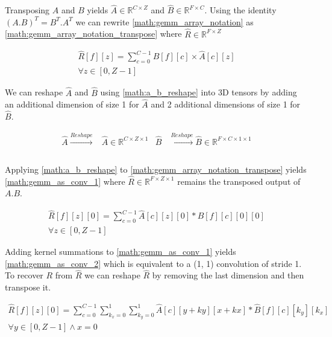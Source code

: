 Transposing $A$ and $B$ yields $\hat{A} \in \mathbb{R}^{C\times Z}$ and $\hat{B} \in
\mathbb{R}^{F\times C}$. Using the identity $(A.B)^T = B^T.A^T$ we can rewrite
\autoref{math:gemm_array_notation} as
\autoref{math:gemm_array_notation_transpose} where $\hat{R} \in
\mathbb{R}^{F\times Z}$

\begin{equation}
    \begin{aligned}
        \hat{R}[f][z] = \displaystyle\sum\limits_{c=0}^{C-1}\hat{B}[f][c]\times \hat{A}[c][z] \\ \forall z\in[0, Z-1]
    \end{aligned}
    \label{math:gemm_array_notation_transpose}
\end{equation}

We can reshape $\hat{A}$ and $\hat{B}$ using \autoref{math:a_b_reshape} into 3D
tensors by adding an additional dimension of size 1 for $\hat{A}$ and 2
additional dimensions of size 1 for $\hat{B}$.

\begin{equation}
    \begin{aligned}
        \hat{A} \xrightarrow[]{Reshape} &\hat{A}  \in \mathbb{R}^{C \times Z\times 1}   &\hat{B} & \xrightarrow[]{Reshape} \hat{B}  \in \mathbb{R}^{F \times C\times 1\times 1} \\
    \end{aligned}
    \label{math:a_b_reshape}
\end{equation}

Applying \autoref{math:a_b_reshape} to
\autoref{math:gemm_array_notation_transpose} yields
\autoref{math:gemm_as_conv_1} where $\hat{R} \in \mathbb{R}^{F \times Z\times 1}
$ remains the transposed output of $A.B$. 

\begin{equation}
    \begin{aligned}
        \hat{R}[f][z][0] = \displaystyle\sum\limits_{c=0}^{C-1}\hat{A}[c][z][0]*\hat{B}[f][c][0][0] \\ \forall z \in [0, Z-1] 
        \end{aligned}
    \label{math:gemm_as_conv_1}
\end{equation}

Adding kernel summations to \autoref{math:gemm_as_conv_1} yields
\autoref{math:gemm_as_conv_2} which is equivalent to a (1, 1) convolution of stride
1. To recover $R$ from $\hat{R}$ we can reshape $\hat{R}$ by removing the
last dimension and then transpose it. 

\begin{equation}
    \begin{aligned}
        \hat{R}[f][z][0] = \displaystyle\sum\limits_{c=0}^{C-1}\displaystyle\sum\limits_{k_x=0}^{1} \displaystyle\sum\limits_{k_y=0}^{1}\hat{A}[c][y+ky][x+kx]*\hat{B}[f][c][k_y][k_x] \\ \forall y \in [0, Z-1] \land x = 0
    \end{aligned}
    \label{math:gemm_as_conv_2}
\end{equation}

